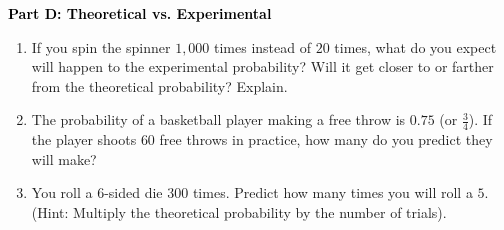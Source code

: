 \documentclass[12pt, letterpaper, fleqn]{article}
\begin{document}
\begin{tcolorbox}[colback=customteal!20]
\large\textcolor{black}{\textbf{Part D: Theoretical vs. Experimental}}
\end{tcolorbox}

\vspace{3mm}

\begin{enumerate}[itemsep=2.5cm, leftmargin=0.6cm, resume]
\item If you spin the spinner $1,000$ times instead of $20$ times, what do you expect will happen to the experimental probability? Will it get closer to or farther from the theoretical probability? Explain.
\item The probability of a basketball player making a free throw is $0.75$ (or $\frac{3}{4}$). If the player shoots $60$ free throws in practice, how many do you predict they will make?
\item You roll a 6-sided die $300$ times. Predict how many times you will roll a $5$. (Hint: Multiply the theoretical probability by the number of trials).
\end{enumerate}
\end{document}
